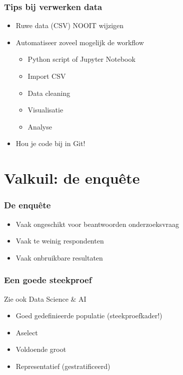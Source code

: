 \documentclass[aspectratio=169]{beamer}
\begin{document}
\begin{frame}
  \frametitle{Tips bij verwerken data}

  \begin{itemize}
    \item Ruwe data (CSV) NOOIT wijzigen
    \item Automatiseer zoveel mogelijk de workflow
      \begin{itemize}
        \item Python script of Jupyter Notebook
        \item Import CSV
        \item Data cleaning
        \item Visualisatie
        \item Analyse
      \end{itemize}
    \item Hou je code bij in Git!
  \end{itemize}


\end{frame}

\section{Valkuil: de enquête}

\begin{frame}
  \frametitle{De enquête}


  \bigskip

  \begin{itemize}
    \item Vaak ongeschikt voor beantwoorden onderzoeksvraag
    \item Vaak te weinig respondenten
    \item Vaak onbruikbare resultaten
  \end{itemize}

\end{frame}

\begin{frame}
  \frametitle{Een goede steekproef}

  Zie ook Data Science \& AI

  \begin{itemize}
    \item Goed gedefinieerde populatie (steekproefkader!)
    \item Aselect
    \item Voldoende groot
    \item Representatief (gestratificeerd)
  \end{itemize}

\end{frame}
\end{document}
